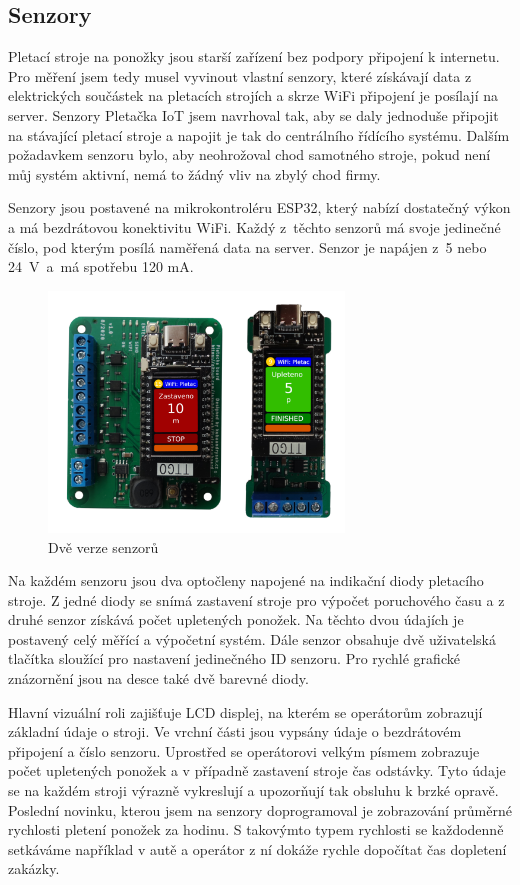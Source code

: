 \documentclass[12pt, a4paper]{article}
\begin{document}
\subsection*{Senzory}

Pletací stroje na ponožky jsou starší zařízení bez podpory připojení k internetu. 
Pro měření jsem tedy musel vyvinout vlastní  senzory, které získávají data z elektrických součástek na pletacích  strojích a skrze WiFi připojení je posílají  na server.
Senzory Pletačka IoT jsem navrhoval tak, aby se daly jednoduše připojit na stávající pletací stroje a napojit je tak do centrálního řídícího systému.
Dalším požadavkem senzoru bylo, aby neohrožoval chod samotného stroje, pokud není můj systém aktivní, nemá to žádný vliv na zbylý chod firmy.

Senzory jsou postavené na mikrokontroléru ESP32, který nabízí dostatečný výkon a má bezdrátovou konektivitu WiFi.
Každý z~těchto senzorů má svoje jedinečné číslo, pod kterým posílá naměřená data na server.
Senzor je napájen z~5 nebo 24~V~a~má spotřebu 120 mA.

\begin{figure}[t]
    \centering
    \includegraphics[width=0.7\textwidth]{img/oba.png}
    \caption{Dvě verze senzorů}
    \label{fig:dveVerze}
\end{figure}

Na každém senzoru jsou dva optočleny napojené na indikační diody pletacího stroje.
Z jedné diody se snímá zastavení stroje pro výpočet poruchového času a z druhé senzor získává počet upletených ponožek.
Na těchto dvou údajích je postavený celý měřící a výpočetní systém.
Dále senzor obsahuje dvě uživatelská tlačítka sloužící pro nastavení jedinečného ID senzoru.
Pro rychlé grafické znázornění jsou na desce také dvě barevné diody.

Hlavní vizuální roli zajišťuje LCD displej, na kterém se operátorům zobrazují základní údaje o stroji.
Ve vrchní části jsou vypsány údaje o bezdrátovém připojení a číslo senzoru.
Uprostřed se operátorovi velkým písmem zobrazuje počet upletených ponožek a v případně zastavení stroje čas odstávky.
Tyto údaje se na každém stroji výrazně vykreslují a upozorňují tak obsluhu k brzké opravě.
Poslední novinku, kterou jsem na senzory doprogramoval je zobrazování průměrné rychlosti pletení ponožek za hodinu.
S takovýmto typem rychlosti se každodenně setkáváme například v autě a operátor z ní dokáže rychle dopočítat čas dopletení zakázky. 
\end{document}
